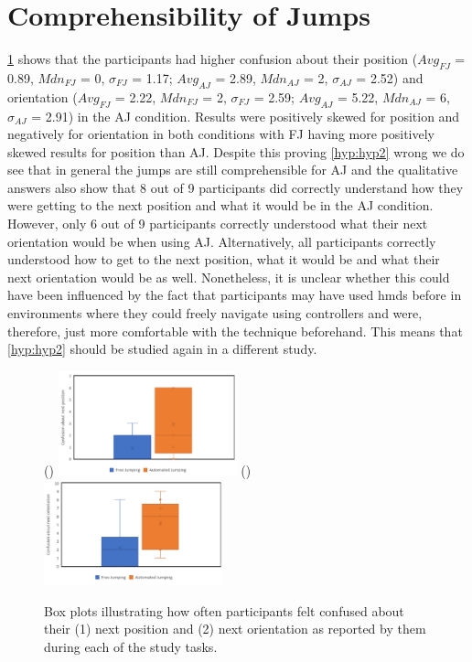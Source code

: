 \section{Comprehensibility of Jumps}
\label{subsection EUS: Comprehensibility of Jumps}
\cref{fig:jump-comprehensibility} shows that the participants had higher confusion about their position ($Avg_{FJ}$ = 0.89, $Mdn_{FJ}$ = 0, $\sigma_{FJ}$ = 1.17; $Avg_{AJ}$ = 2.89, $Mdn_{AJ}$ = 2, $\sigma_{AJ}$ = 2.52) and orientation ($Avg_{FJ}$ = 2.22, $Mdn_{FJ}$ = 2, $\sigma_{FJ}$ = 2.59; $Avg_{AJ}$ = 5.22, $Mdn_{AJ}$ = 6, $\sigma_{AJ}$ = 2.91) in the AJ condition. Results were positively skewed for position and negatively for orientation in both conditions with FJ having more positively skewed results for position than AJ. 
Despite this proving \cref{hyp:hyp2} wrong we do see that in general the jumps are still comprehensible for AJ and the qualitative answers also show that 8 out of 9 participants did correctly understand how they were getting to the next position and what it would be in the AJ condition. However, only 6 out of 9 participants correctly understood what their next orientation would be when using AJ. Alternatively, all participants correctly understood how to get to the next position, what it would be and what their next orientation would be as well. Nonetheless, it is unclear whether this could have been influenced by the fact that participants may have used \acrshort{hmd}s before in environments where they could freely navigate using controllers and were, therefore, just more comfortable with the technique beforehand. This means that \cref{hyp:hyp2} should be studied again in a different study.

\begin{figure}[]
	()
	\includegraphics[width=0.46\textwidth]{images/position.pdf}
	()
	\includegraphics[width=0.46\textwidth]{images/orientation.pdf}
	\caption{Box plots illustrating how often participants felt confused about their (1) next position and (2) next orientation as reported by them during each of the study tasks.}
	\label{fig:jump-comprehensibility}
\end{figure}

